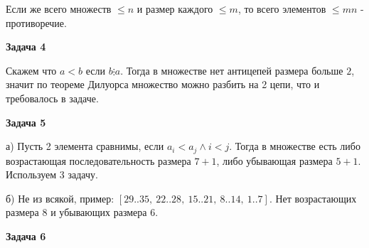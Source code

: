 Если же всего множеств $\displaystyle \leqslant n$ и размер каждого $\displaystyle \leqslant m$, то всего элементов $\displaystyle \leqslant mn$ - противоречие.

\begin{center}
\textbf{Задача 4}
\end{center}
Скажем что $\displaystyle a< b$ если $\displaystyle b\vdots a$. Тогда в множестве нет антицепей размера больше $\displaystyle 2$, значит по теореме Дилуорса множество можно разбить на 2 цепи, что и требовалось в задаче.

\begin{center}
\textbf{Задача 5}
\end{center}
а) Пусть 2 элемента сравнимы, если $\displaystyle a_{i} < a_{j} \land i< j$. Тогда в множестве есть либо возрастающая последовательность размера $\displaystyle 7+1$, либо убывающая размера $\displaystyle 5+1$. Используем $\displaystyle 3$ задачу. 

б) Не из всякой, пример: $\displaystyle [ 29..35,\ 22..28,\ 15..21,\ 8..14,\ 1..7]$. Нет возрастающих размера $\displaystyle 8$ и убывающих размера $\displaystyle 6$.

\begin{center}
\textbf{Задача 6}
\end{center}
